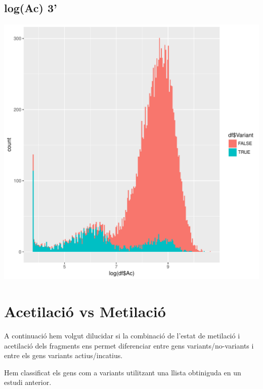 \documentclass{article}\usepackage[]{graphicx}\usepackage[]{color}
\newenvironment{knitrout}{}{} %
\begin{document}
\subsection{log(Ac) 3'}
\begin{knitrout}
\color{fgcolor}

{\centering \includegraphics[width=1\linewidth]{figure/minimal-dens_3_met-1} 

}



\end{knitrout}
\clearpage

\section{Acetilació vs Metilació}
A continuació hem volgut dilucidar si la combinació de l'estat de metilació i acetilació dels fragments ens permet diferenciar entre gens variants/no-variants i entre els gens variants actius/incatius.

Hem classificat els gens com a variants utilitzant una llista obtiniguda en un estudi anterior.
\clearpage
\end{document}
